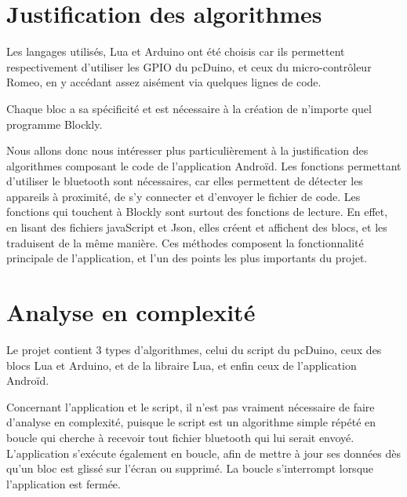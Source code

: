 \documentclass[12pt,francais]{report}
\begin{document}
\section*{Justification des algorithmes}

Les langages utilisés, Lua et Arduino ont été choisis car ils permettent respectivement d'utiliser les GPIO du pcDuino, et ceux du micro-contrôleur Romeo, en y accédant assez aisément via quelques lignes de code.

Chaque bloc a sa spécificité et est nécessaire à la création de n'importe quel programme Blockly.

\bigskip
Nous allons donc nous intéresser plus particulièrement à la justification des algorithmes composant le code de l'application Androïd.
Les fonctions permettant d'utiliser le bluetooth sont nécessaires, car elles permettent de détecter les appareils à proximité, de s'y connecter et d'envoyer le fichier de code. Les fonctions qui touchent à Blockly sont surtout des fonctions de lecture. En effet, en lisant des fichiers javaScript et Json, elles créent et affichent des blocs, et les traduisent de la même manière. Ces méthodes composent la fonctionnalité principale de l'application, et l'un des points les plus importants du projet.



\section*{Analyse en complexité}

Le projet contient 3 types d'algorithmes, celui du script du pcDuino, ceux des blocs Lua et Arduino, et de la libraire Lua, et enfin ceux de l'application Androïd.

Concernant l'application et le script, il n'est pas vraiment nécessaire de faire d'analyse en complexité, puisque le script est un algorithme simple répété en boucle qui cherche à recevoir tout fichier bluetooth qui lui serait envoyé. L'application s'exécute également en boucle, afin de mettre à jour ses données dès qu'un bloc est glissé sur l'écran ou supprimé. La boucle s'interrompt lorsque l'application est fermée.
\end{document}
